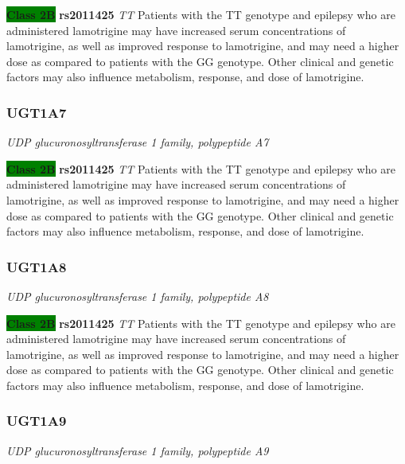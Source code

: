 \documentclass{report}
\begin{document}
\textbf{\colorbox{green} {Class 2B}} \textbf{ rs2011425 } \textit{ TT }
Patients with the TT genotype and epilepsy who are administered lamotrigine may have increased serum concentrations of lamotrigine, as well as improved response to lamotrigine, and may need a higher dose as compared to patients with the GG genotype. Other clinical and genetic factors may also influence metabolism, response, and dose of lamotrigine.  \newline\subsubsection{ UGT1A7 }
\textit{ UDP glucuronosyltransferase 1 family, polypeptide A7 } \newline





\textbf{\colorbox{green} {Class 2B}} \textbf{ rs2011425 } \textit{ TT }
Patients with the TT genotype and epilepsy who are administered lamotrigine may have increased serum concentrations of lamotrigine, as well as improved response to lamotrigine, and may need a higher dose as compared to patients with the GG genotype. Other clinical and genetic factors may also influence metabolism, response, and dose of lamotrigine.  \newline\subsubsection{ UGT1A8 }
\textit{ UDP glucuronosyltransferase 1 family, polypeptide A8 } \newline





\textbf{\colorbox{green} {Class 2B}} \textbf{ rs2011425 } \textit{ TT }
Patients with the TT genotype and epilepsy who are administered lamotrigine may have increased serum concentrations of lamotrigine, as well as improved response to lamotrigine, and may need a higher dose as compared to patients with the GG genotype. Other clinical and genetic factors may also influence metabolism, response, and dose of lamotrigine.  \newline\subsubsection{ UGT1A9 }
\textit{ UDP glucuronosyltransferase 1 family, polypeptide A9 } \newline
\end{document}
